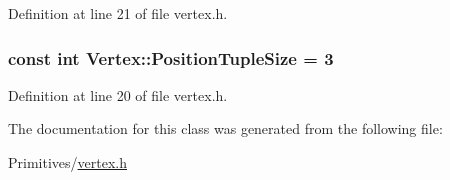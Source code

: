 Definition at line 21 of file vertex.\+h.

\hypertarget{class_vertex_a8ddae32c242e3c94f94a7565966a86ca}{}
\subsubsection[{Position\+Tuple\+Size}]{\setlength{\rightskip}{0pt plus 5cm}const int Vertex\+::\+Position\+Tuple\+Size = 3\hspace{0.3cm}{\ttfamily [static]}}\label{class_vertex_a8ddae32c242e3c94f94a7565966a86ca}


Definition at line 20 of file vertex.\+h.



The documentation for this class was generated from the following file\+:\begin{DoxyCompactItemize}
\item 
Primitives/\hyperlink{vertex_8h}{vertex.\+h}\end{DoxyCompactItemize}
